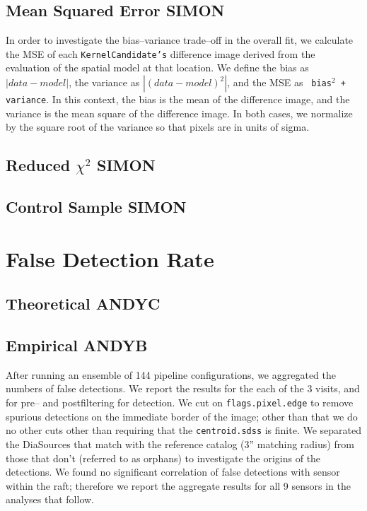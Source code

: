 \documentclass[prd, nofootinbib, floatfix, 11pt,tightenlines,times]{article}
\begin{document}
\subsection{Mean Squared Error {\bf SIMON}}

In order to investigate the bias--variance trade--off in the overall
fit, we calculate the MSE of each {\tt KernelCandidate's} difference
image derived from the evaluation of the spatial model at that
location.  We define the bias as $\left| data - model \right|$, the
variance as $\left| (data - model)^2 \right|$, and the MSE as {\tt
  bias$^2$ + variance}.  In this context, the bias is the mean of the
difference image, and the variance is the mean square of the
difference image.  In both cases, we normalize by the square root of
the variance so that pixels are in units of sigma.

\subsection{Reduced $\chi^2$ {\bf SIMON}}

\subsection{Control Sample {\bf SIMON}}

\section{False Detection Rate}

\subsection{Theoretical {\bf ANDYC}}

\subsection{Empirical {\bf ANDYB}}

After running an ensemble of 144 pipeline configurations, we
aggregated the numbers of false detections.  We report the results for
the each of the 3 visits, and for pre-- and postfiltering for
detection.  We cut on {\tt flags.pixel.edge} to remove spurious
detections on the immediate border of the image; other than that we do
no other cuts other than requiring that the {\tt centroid.sdss} is
finite.  We separated the DiaSources that match with the reference
catalog (3'' matching radius) from those that don't (referred to as
orphans) to investigate the origins of the detections.  We found no
significant correlation of false detections with sensor within the
raft; therefore we report the aggregate results for all 9 sensors in
the analyses that follow.
\end{document}
